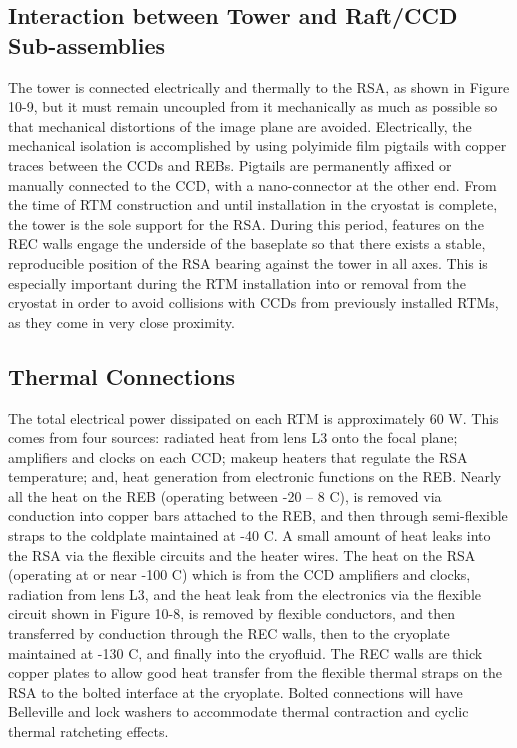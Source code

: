 \subsection{Interaction between Tower and Raft/CCD Sub-assemblies}
The tower is connected electrically and thermally to the RSA, as shown in Figure 10-9, but it must remain uncoupled from it mechanically as much as possible so that mechanical distortions of the image plane are avoided. Electrically, the mechanical isolation is accomplished by using polyimide film pigtails with copper traces between the CCDs and REBs. Pigtails are permanently affixed or manually connected to the CCD, with a nano-connector at the other end. 
From the time of RTM construction and until installation in the cryostat is complete, the tower is the sole support for the RSA. During this period, features on the REC walls engage the underside of the baseplate so that there exists a stable, reproducible position of the RSA bearing against the tower in all axes. This is especially important during the RTM installation into or removal from the cryostat in order to avoid collisions with CCDs from previously installed RTMs, as they come in very close proximity.

\subsection{Thermal Connections}
The total electrical power dissipated on each RTM is approximately 60 W. This comes from four sources: radiated heat from lens L3 onto the focal plane; amplifiers and clocks on each CCD; makeup heaters that regulate the RSA temperature; and, heat generation from electronic functions on the REB.  Nearly all the heat on the REB (operating between -20 – 8 C), is removed via conduction into copper bars attached to the REB, and then through semi-flexible straps to the coldplate maintained at -40 C. A small amount of heat leaks into the RSA via the flexible circuits and the heater wires. The heat on the RSA (operating at or near -100 C) which is from the CCD amplifiers and clocks, radiation from lens L3, and the heat leak from the electronics via the flexible circuit shown in Figure 10-8, is removed by flexible conductors, and then transferred by conduction through the REC walls, then to the cryoplate maintained at -130 C, and finally into the cryofluid.
The REC walls are thick copper plates to allow good heat transfer from the flexible thermal straps on the RSA to the bolted interface at the cryoplate. Bolted connections will have Belleville and lock washers to accommodate thermal contraction and cyclic thermal ratcheting effects.
 
